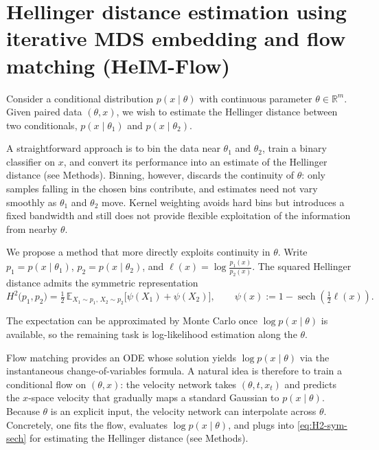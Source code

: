 \section{Hellinger distance estimation using iterative MDS embedding and flow matching (HeIM-Flow)}

Consider a conditional distribution $p(x \mid \theta)$ with continuous parameter $\theta \in \mathbb{R}^m$. Given paired data $(\theta, x)$, we wish to estimate the Hellinger distance between two conditionals, $p(x \mid \theta_1)$ and $p(x \mid \theta_2)$.

A straightforward approach is to bin the data near $\theta_1$ and $\theta_2$, train a binary classifier on $x$, and convert its performance into an estimate of the Hellinger distance (see Methods). Binning, however, discards the continuity of $\theta$: only samples falling in the chosen bins contribute, and estimates need not vary smoothly as $\theta_1$ and $\theta_2$ move. Kernel weighting avoids hard bins but introduces a fixed bandwidth and still does not provide flexible exploitation of the information from nearby $\theta$.

We propose a method that more directly exploits continuity in $\theta$. Write $p_1 = p(x \mid \theta_1)$, $p_2 = p(x \mid \theta_2)$, and $\ell(x) = \log \frac{p_1(x)}{p_2(x)}$. The squared Hellinger distance admits the symmetric representation
\begin{equation}
\label{eq:H2-sym-sech}
H^2\bigl(p_1, p_2\bigr)
=
\tfrac{1}{2} \,
\mathbb{E}_{X_1 \sim p_1,\, X_2 \sim p_2}
\bigl[
\psi(X_1) + \psi(X_2)
\bigr],
\qquad
\psi(x) := 1 - \operatorname{sech}\!\left( \tfrac{1}{2} \ell(x) \right).
\end{equation}

The expectation can be approximated by Monte Carlo once $\log p(x \mid \theta)$ is available, so the remaining task is log-likelihood estimation along the $\theta$.

Flow matching provides an ODE whose solution yields $\log p(x \mid \theta)$ via the instantaneous change-of-variables formula. A natural idea is therefore to train a conditional flow on $(\theta, x)$: the velocity network takes $(\theta, t, x_t)$ and predicts the $x$-space velocity that gradually maps a standard Gaussian to $p(x \mid \theta)$. Because $\theta$ is an explicit input, the velocity network can interpolate across $\theta$. Concretely, one fits the flow, evaluates $\log p(x \mid \theta)$, and plugs into \eqref{eq:H2-sym-sech} for estimating the Hellinger distance (see Methods).

